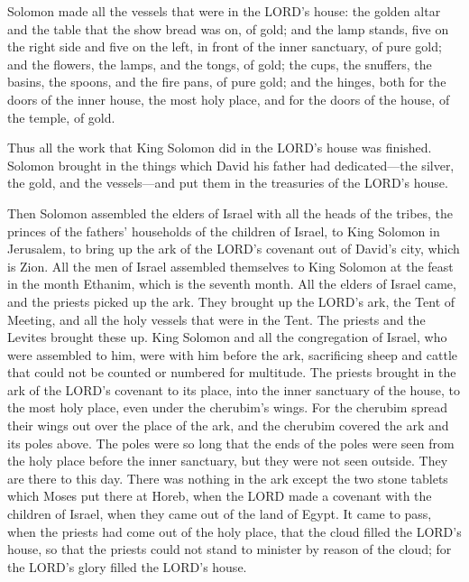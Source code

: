 \myverse{}Solomon made all the vessels that were in the LORD’s house: the
golden altar and the table that the show bread was on, of gold;
\myverse{}and the lamp stands, five on the right side and five on the left, in front
of the inner sanctuary, of pure gold; and the flowers, the lamps, and the tongs, of gold;
\myverse{}the cups, the snuffers, the basins, the spoons, and the fire pans, of pure
gold; and the hinges, both for the doors of the inner house, the most holy place, and for the doors of
the house, of the temple, of gold.

\myverse{}Thus all the work that King Solomon did in the LORD’s house was
finished. Solomon brought in the things which David his father had dedicated—the silver, the gold, and
the vessels—and put them in the treasuries of the LORD’s house.


\mychapter{} \myverse*{}Then Solomon assembled the elders of Israel with all the heads
of the tribes, the princes of the fathers’ households of the children of Israel, to King Solomon in Jerusalem,
to bring up the ark of the LORD’s covenant out of David’s city, which is Zion.
\myverse{}All the men of Israel assembled themselves to King Solomon at the feast in the
month Ethanim, which is the seventh month.
\myverse{}All the elders of Israel came, and the priests picked up the ark.
\myverse{}They brought up the LORD’s ark, the Tent of Meeting, and all the holy vessels
that were in the Tent. The priests and the Levites brought these up.
\myverse{}King Solomon and all the congregation of Israel, who were assembled to him,
were with him before the ark, sacrificing sheep and cattle that could not be counted or numbered for multitude.
\myverse{}The priests brought in the ark of the LORD’s covenant to its place, into the
inner sanctuary of the house, to the most holy place, even under the cherubim’s wings.
\myverse{}For the cherubim spread their wings out over the place of the ark, and the cherubim
covered the ark and its poles above.
\myverse{}The poles were so long that the ends of the poles were seen from the holy place
before the inner sanctuary, but they were not seen outside. They are there to this day.
\myverse{}There was nothing in the ark except the two stone tablets which Moses put there
at Horeb, when the LORD made a covenant with the children of Israel, when they came out of the land of
Egypt.
\myverse{}It came to pass, when the priests had come out of the holy place, that the
cloud filled the LORD’s house,
\myverse{}so that the priests could not stand to minister by reason of the cloud; for
the LORD’s glory filled the LORD’s house.

